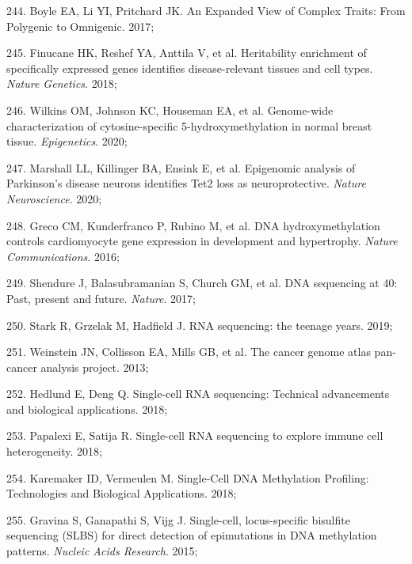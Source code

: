 \documentclass[11pt,oneside]{bristolthesis}
\newenvironment{cslreferences}%
  {}%
  {\par}
\begin{document}
\begin{cslreferences}
\leavevmode\hypertarget{ref-Boyle2017}{}%
244. Boyle EA, Li YI, Pritchard JK. An Expanded View of Complex Traits: From Polygenic to Omnigenic. 2017;

\leavevmode\hypertarget{ref-Finucane2018}{}%
245. Finucane HK, Reshef YA, Anttila V, et al. Heritability enrichment of specifically expressed genes identifies disease-relevant tissues and cell types. \emph{Nature Genetics}. 2018;

\leavevmode\hypertarget{ref-Wilkins2020}{}%
246. Wilkins OM, Johnson KC, Houseman EA, et al. Genome-wide characterization of cytosine-specific 5-hydroxymethylation in normal breast tissue. \emph{Epigenetics}. 2020;

\leavevmode\hypertarget{ref-Marshall2020}{}%
247. Marshall LL, Killinger BA, Ensink E, et al. Epigenomic analysis of Parkinson's disease neurons identifies Tet2 loss as neuroprotective. \emph{Nature Neuroscience}. 2020;

\leavevmode\hypertarget{ref-Greco2016}{}%
248. Greco CM, Kunderfranco P, Rubino M, et al. DNA hydroxymethylation controls cardiomyocyte gene expression in development and hypertrophy. \emph{Nature Communications}. 2016;

\leavevmode\hypertarget{ref-Shendure2017}{}%
249. Shendure J, Balasubramanian S, Church GM, et al. DNA sequencing at 40: Past, present and future. \emph{Nature}. 2017;

\leavevmode\hypertarget{ref-Stark2019}{}%
250. Stark R, Grzelak M, Hadfield J. RNA sequencing: the teenage years. 2019;

\leavevmode\hypertarget{ref-Weinstein2013}{}%
251. Weinstein JN, Collisson EA, Mills GB, et al. The cancer genome atlas pan-cancer analysis project. 2013;

\leavevmode\hypertarget{ref-Hedlund2018}{}%
252. Hedlund E, Deng Q. Single-cell RNA sequencing: Technical advancements and biological applications. 2018;

\leavevmode\hypertarget{ref-Papalexi2018}{}%
253. Papalexi E, Satija R. Single-cell RNA sequencing to explore immune cell heterogeneity. 2018;

\leavevmode\hypertarget{ref-Karemaker2018}{}%
254. Karemaker ID, Vermeulen M. Single-Cell DNA Methylation Profiling: Technologies and Biological Applications. 2018;

\leavevmode\hypertarget{ref-Gravina2015}{}%
255. Gravina S, Ganapathi S, Vijg J. Single-cell, locus-specific bisulfite sequencing (SLBS) for direct detection of epimutations in DNA methylation patterns. \emph{Nucleic Acids Research}. 2015;


\end{cslreferences}
\end{document}
